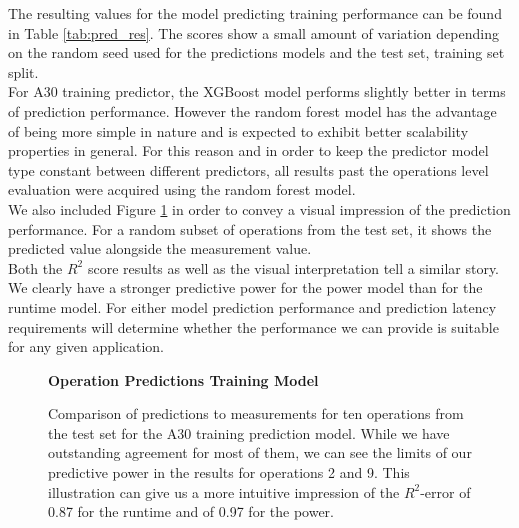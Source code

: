 The resulting values for the model predicting training performance can be found in Table \ref{tab:pred_res}. The scores show a small amount of variation depending on the random seed used for the predictions models and the test set, training set split. \\
For A30 training predictor, the XGBoost model performs slightly better in terms of prediction performance. However the random forest model has the advantage of being more simple in nature and is expected to exhibit better scalability properties in general. For this reason and in order to keep the predictor model type constant between different predictors, all results past the operations level evaluation were acquired using the random forest model. \\
We also included Figure \ref{fig:testsetoperations} in order to convey a visual impression of the prediction performance. For a random subset of operations from the test set, it shows the predicted value alongside the measurement value. \\
Both the $R^2$ score results as well as the visual interpretation tell a similar story. We clearly have a stronger predictive power for the power model than for the runtime model. For either model prediction performance and prediction latency requirements will determine whether the performance we can provide is suitable for any given application.


\begin{figure}[htbp]
    \centering
    \parbox{1.1\textwidth}{\centering\textbf{Operation Predictions Training Model}}
    \caption{Comparison of predictions to measurements for ten operations from the test set for the A30 training prediction model. While we have outstanding agreement for most of them, we can see the limits of our predictive power in the results for operations 2 and 9. This illustration can give us a more intuitive impression of the $R^2$-error of 0.87 for the runtime and of 0.97 for the power.}
    \label{fig:testsetoperations}
\end{figure}


